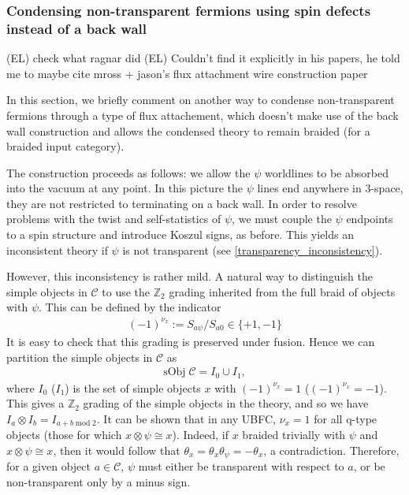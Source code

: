 \documentclass[12pt,a4paper]{article}
\newcommand{\tp}{\otimes}
\newcommand{\mcc}{\mathcal{C}}
\newcommand{\zt}{\mathbb{Z}_2}
\newcommand{\kw}[1]{{\color{kwcolor}\footnotesize{(KW) #1}}}
\newcommand{\ethan}[1]{{\color{amethyst}\footnotesize{(EL) #1}}}
\begin{document}
\subsubsection{Condensing non-transparent fermions using spin defects instead of a back wall} \label{spin_defects_condensation}

\ethan{check what ragnar did}
\ethan{Couldn't find it explicitly in his papers, he told me to maybe cite mross + jason's flux attachment wire construction paper}

In this section, we briefly comment on another way to condense non-transparent fermions through a type of flux attachement, 
which doesn't make use of the back wall construction and allows the condensed theory to remain braided 
(for a braided input category). 

The construction proceeds as follows: we allow the $\psi$ worldlines to be absorbed into the vacuum at any point.
In this picture the $\psi$ lines end anywhere in 3-space, they are not restricted to terminating on a back wall. 
In order to resolve problems with the twist and self-statistics of $\psi$, 
we must couple the $\psi$ endpoints to a spin structure and introduce Koszul signs, as before.
This yields an inconsistent theory if $\psi$ is not transparent (see \eqref{transparency_inconsistency}).

However, this inconsistency is rather mild. 
A natural way to distinguish the simple objects in $\mcc$ to use the $\mathbb{Z}_2$ 
grading inherited from the full braid of objects with $\psi$. 
This can be defined by the indicator 
\begin{align}
(-1)^{\nu_x} := S_{a \psi}/S_{a0} \in \{+1, -1 \}
\label{grading}
\end{align}
It is easy to check that this grading is preserved under fusion.
Hence we can partition the simple objects in $\mcc$ as 
\begin{align} \label{braiding_indicator}
\text{sObj}\; \mathcal{C}  = I_0 \cup I_1,
\end{align}
where $I_0$ ($I_1$) is the set of simple objects $x$ with $(-1)^{\nu_x} = 1$ ($(-1)^{\nu_x} = -1$).
This gives a $\zt$ grading of the simple objects in the theory, and so we have $I_a \tp I_b = I_{a+b\; \text{mod} \; 2}$. 
It can be shown that in any UBFC, $\nu_x = 1$ for all q-type objects (those for which $x\tp \psi \cong x$).
Indeed, if $x$ braided trivially with $\psi$ and $x\tp \psi \cong x$, then it would follow that
$\theta_x = \theta_x \theta_\psi = -\theta_x$, a contradiction.
Therefore, for a given object $a\in\mcc$, $\psi$ must either be transparent with respect to $a$, or be non-transparent only by a minus sign. 
\end{document}
